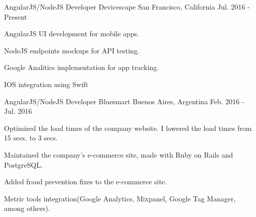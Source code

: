 

\begin{cventries}

  \cventry
      {AngularJS/NodeJS Developer} %
      {Devicescape} %
      {San Francisco, California} %
      {Jul. 2016 - Present} %
      {
        \begin{cvitems} %
          \item {AngularJS UI development for mobile apps.}
          \item {NodeJS endpoints mockups for API testing.}
          \item {Google Analitics implementation for app tracking.}
          \item {IOS integration using Swift}
        \end{cvitems}
      }


  \cventry
    {AngularJS/NodeJS Developer} %
    {Bluesmart} %
    {Buenos Aires, Argentina} %
    {Feb. 2016 - Jul. 2016} %
    {
      \begin{cvitems} %
        \item {Optimized the load times of the company website. I lowered the load times from 15 secs. to 3 secs.}
        \item {Maintained the company's e-commerce site, made with Ruby on Rails and PostgreSQL.}
        \item {Added fraud prevention fixes to the e-commerce site.}
        \item {Metric tools integration(Google Analytics, Mixpanel, Google Tag Manager, among others).}
      \end{cvitems}
    }


\end{cventries}
